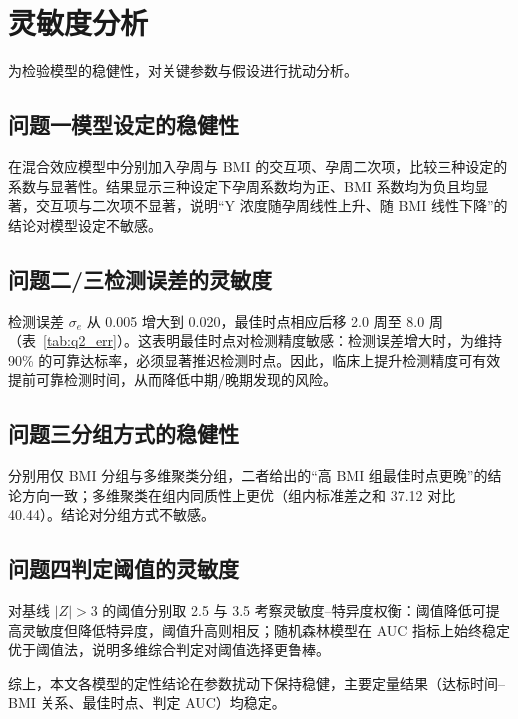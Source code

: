 \section{灵敏度分析}

为检验模型的稳健性，对关键参数与假设进行扰动分析。

\subsection{问题一模型设定的稳健性}

在混合效应模型中分别加入孕周与 BMI 的交互项、孕周二次项，比较三种设定的系数与显著性。结果显示三种设定下孕周系数均为正、BMI 系数均为负且均显著，交互项与二次项不显著，说明``Y 浓度随孕周线性上升、随 BMI 线性下降''的结论对模型设定不敏感。

\subsection{问题二/三检测误差的灵敏度}

检测误差 $\sigma_e$ 从 0.005 增大到 0.020，最佳时点相应后移 2.0 周至 8.0 周（表~\ref{tab:q2_err}）。这表明最佳时点对检测精度敏感：检测误差增大时，为维持 90\% 的可靠达标率，必须显著推迟检测时点。因此，临床上提升检测精度可有效提前可靠检测时间，从而降低中期/晚期发现的风险。

\subsection{问题三分组方式的稳健性}

分别用仅 BMI 分组与多维聚类分组，二者给出的``高 BMI 组最佳时点更晚''的结论方向一致；多维聚类在组内同质性上更优（组内标准差之和 37.12 对比 40.44）。结论对分组方式不敏感。

\subsection{问题四判定阈值的灵敏度}

对基线 $|Z|>3$ 的阈值分别取 2.5 与 3.5 考察灵敏度--特异度权衡：阈值降低可提高灵敏度但降低特异度，阈值升高则相反；随机森林模型在 AUC 指标上始终稳定优于阈值法，说明多维综合判定对阈值选择更鲁棒。

综上，本文各模型的定性结论在参数扰动下保持稳健，主要定量结果（达标时间--BMI 关系、最佳时点、判定 AUC）均稳定。

